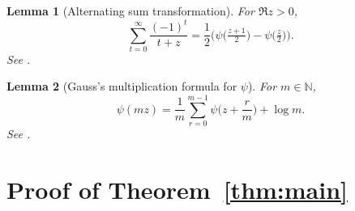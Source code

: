 \documentclass[11pt]{article}
\numberwithin{equation}{section}
\theoremstyle{plain}
\newtheorem{lemma}{Lemma}[section]
\begin{document}
\begin{lemma}[Alternating sum transformation]\label{lem:alt-digamma}
For $\Re z>0$, 
\[
\sum_{t=0}^{\infty}\frac{(-1)^{t}}{t+z}=\frac{1}{2}\Big(\psi\!\big(\tfrac{z+1}{2}\big)-\psi\!\big(\tfrac{z}{2}\big)\Big).
\]
See \cite[Eqs.~5.7.6, 5.5.2]{DLMF}.
\end{lemma}

\begin{lemma}[Gauss's multiplication formula for $\psi$]\label{lem:gauss}
For $m\in\mathbb{N}$, 
\[
\psi(mz)=\frac{1}{m}\sum_{r=0}^{m-1}\psi\!\Big(z+\frac{r}{m}\Big)+\log m.
\]
See \cite[Eq.~5.5.6]{DLMF}.
\end{lemma}

\section{Proof of Theorem~\ref{thm:main}}
\end{document}
